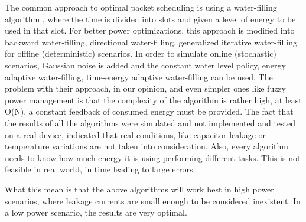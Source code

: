 The common approach to optimal packet scheduling is using a water-filling algorithm
\cite{yang2012optimal} \cite{huan2013utility}, where the time
is divided into slots and given a level of energy to be used in that slot. For better power
optimizations, this approach is modified into backward water-filling, directional water-filling,
generalized iterative water-filling \cite{want2015iterative} for offline (deterministic) scenarios. In order to simulate
online (stochastic) scenarios, Gaussian noise is added and the constant water level policy, energy
adaptive water-filling\cite{ozel2012optimal}, time-energy adaptive water-filling\cite{ozel2011transimision} can be used.
The problem with their approach, in our opinion, and even simpler ones like fuzzy power management
\cite{aoudia2016fuzzy} is that the complexity of the algorithm is rather high, at least O(N), a
constant feedback of consumed energy must be provided. The fact that the results of all the
algorithms were simulated and not implemented and tested on a real device, indicated that real
conditions, like capacitor leakage or temperature variations are not taken into consideration.
Also, every algorithm needs to know how much energy it is using performing different tasks. This is
not feasible in real world, in time leading to large errors.

What this mean is that the above algorithms will work best in high power scenarios, where leakage
currents are small enough to be considered inexistent. In a low power scenario, the results are
very optimal.

